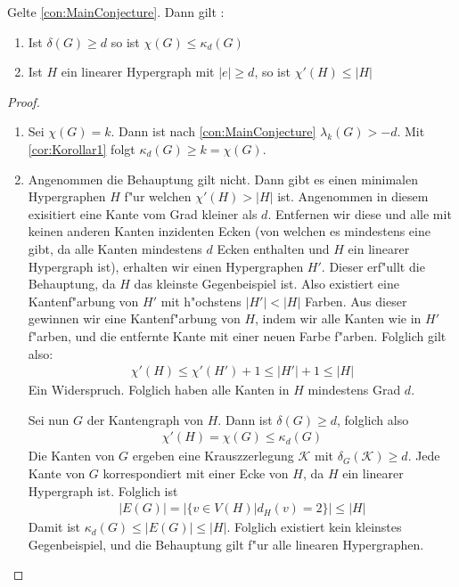 \begin{theorem}
  \label{thm:MainTheorem}
  Gelte \ref{con:MainConjecture}. Dann gilt :
  \begin{enumerate}[label=(\alph*)]
    \item \label{en:mainconfirst}Ist $\delta\left( G \right) \geq d$ so ist $\chi\left( G \right)\leq \kappa_{d}\left( G \right)$
    \item  Ist $H$ ein linearer Hypergraph mit $\left|e\right| \geq d$, so ist $\chi'\left( H \right)\leq \left|H\right| $
  \end{enumerate}
\end{theorem}

\begin{proof}

  \begin{enumerate}[label=(\alph*)]
    \item Sei $\chi(G) = k$. Dann ist nach \ref{con:MainConjecture} $\lambda_{k}\left( G \right) > -d$. Mit \ref{cor:Korollar1} folgt $\kappa_{d}\left( G \right) \geq k = \chi\left( G \right)$.
    \item Angenommen die Behauptung gilt nicht. Dann gibt es einen minimalen Hypergraphen $H$ f"ur welchen $\chi'(H) > |H|$ ist. Angenommen in diesem exisitiert eine Kante vom Grad kleiner als $d$. Entfernen wir diese und alle mit keinen anderen Kanten inzidenten Ecken (von welchen es mindestens eine gibt, da alle Kanten mindestens $d$ Ecken enthalten und $H$ ein linearer Hypergraph ist), erhalten wir einen Hypergraphen $H'$. 
      Dieser erf"ullt die Behauptung, da $H$ das kleinste Gegenbeispiel ist. Also existiert eine Kantenf"arbung von $H'$ mit h"ochstens $|H'| < |H|$ Farben. Aus dieser gewinnen wir eine Kantenf"arbung von $H$, indem wir alle Kanten wie in $H'$ f"arben, und die entfernte Kante mit einer neuen Farbe f"arben. Folglich gilt also:
      \begin{align*}
        \chi'(H) \leq \chi'(H') +1 \leq |H'|+1 \leq |H|
      \end{align*}
      Ein Widerspruch. Folglich haben alle Kanten in $H$ mindestens Grad $d$. 

      Sei nun $G$ der Kantengraph von $H$. Dann ist $\delta(G) \geq d$, folglich also 
      \begin{align*}
        \chi'(H) = \chi(G) \leq \kappa_{d}(G) 
      \end{align*}
      Die Kanten von $G$ ergeben eine Krauszzerlegung $\mathcal{K}$ mit $\delta_{G}(\mathcal{K}) \geq d$. Jede Kante von $G$ korrespondiert mit einer Ecke von $H$, da $H$ ein linearer Hypergraph ist. Folglich ist 
      \begin{align*}
        |E(G)| = |\{ v \in V(H) | d_{H}(v) = 2 \}| \leq |H|
      \end{align*}
      Damit ist $\kappa_{d}(G) \leq |E(G)|\leq |H|$. Folglich existiert kein kleinstes Gegenbeispiel, und die Behauptung gilt f"ur alle linearen Hypergraphen.
  \end{enumerate}
\end{proof}


